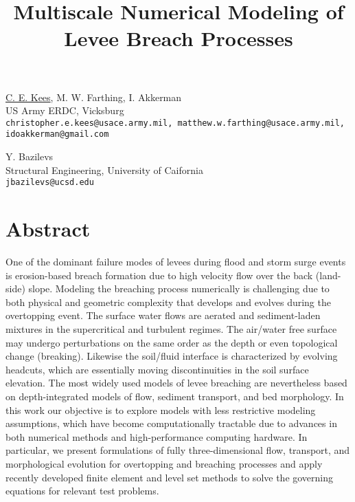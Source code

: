 \title{Multiscale Numerical Modeling of Levee Breach Processes}
\author{} \institute{}
\maketitle

\begin{center}
{\large \underline{C. E. Kees}, M. W. Farthing, I. Akkerman}\\
US Army ERDC, Vicksburg\\
{\tt christopher.e.kees@usace.army.mil, matthew.w.farthing@usace.army.mil, idoakkerman@gmail.com}\\
\vspace{4mm}

{\large Y. Bazilevs}\\
Structural Engineering, University of Caifornia\\
{\tt jbazilevs@ucsd.edu}
\end{center}

\section*{Abstract}
One of the dominant failure modes of levees during flood and storm surge events is erosion-based breach formation due to high velocity flow over the back (land-side) slope.  Modeling the breaching process numerically is challenging due to both physical and geometric complexity that develops and evolves during the overtopping event. The surface water flows are aerated and sediment-laden mixtures in the supercritical and turbulent regimes. The air/water free surface may undergo perturbations on the same order as the depth or even topological change (breaking). Likewise the soil/fluid interface is characterized by evolving headcuts, which are essentially moving discontinuities in the soil surface elevation. The most widely used models of levee breaching are nevertheless based on depth-integrated
models of flow, sediment transport, and bed morphology. In this work our objective is to explore models with less restrictive modeling assumptions, which have become computationally tractable due to advances in both numerical methods and high-performance computing hardware. In particular, we present formulations of fully three-dimensional flow, transport, and morphological evolution for overtopping and breaching processes and apply recently developed finite element and level set methods to solve the governing equations for relevant test problems.